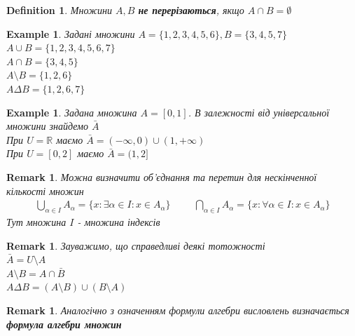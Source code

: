 \documentclass[a4paper, 14pt]{extarticle}
\theoremstyle{theoremdd}
\theoremstyle{theoremdd}
\newtheorem{definition}[theorem]{Definition}
\theoremstyle{theoremdd}
\theoremstyle{theoremdd}
\newtheorem{example}[theorem]{Example}
\theoremstyle{theoremdd}
\theoremstyle{theoremdd}
\newtheorem{remark}[theorem]{Remark}
\theoremstyle{theoremdd}
\theoremstyle{theoremdd}
\begin{document}
\begin{definition}
Множини $A,B$ \textbf{не перерізаються}, якщо $A \cap B = \emptyset$
\end{definition}

\begin{example}
Задані множини $A = \{1,2,3,4,5,6\}, B = \{3,4,5,7\}$\\
$A \cup B = \{1,2,3,4,5,6,7\}$\\
$A \cap B = \{3,4,5\}$\\
$A \setminus B = \{1,2,6\}$\\
$A \Delta B = \{1,2,6,7\}$
\end{example}

\begin{example}
Задана множина $A = [0,1]$. В залежності від універсальної множини знайдемо $\bar{A}$\\
При $U = \mathbb{R}$ маємо $\bar{A} = (-\infty,0) \cup (1,+\infty)$\\
При $U = [0,2]$ маємо $\bar{A} = (1,2]$
\end{example}

\begin{remark}
Можна визначити об'єднання та перетин для нескінченної кількості множин
\begin{align*}
\bigcup_{\alpha \in I} A_{\alpha} = \{x: \exists \alpha \in I: x \in A_{\alpha}\} \hspace{1cm} \bigcap_{\alpha \in I} A_{\alpha} = \{x: \forall \alpha \in I: x \in A_{\alpha}\}
\end{align*}
Тут множина $I$ - множина індексів
\end{remark}

\begin{remark}
Зауважимо, що справедливі деякі тотожності\\
$\bar{A} = U \setminus A$\\
$A \setminus B = A \cap \bar{B}$\\
$A \Delta B = (A \setminus B) \cup (B \setminus A)$
\end{remark}

\begin{remark}
Аналогічно з означенням формули алгебри висловлень визначається \textbf{формула алгебри множин}
\end{remark}
\end{document}
